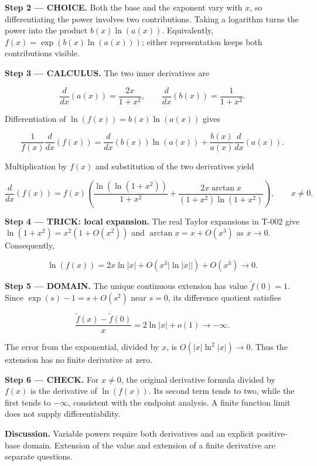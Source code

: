 \documentclass[11pt,oneside,openany]{book}
\begin{document}
\begin{ChoiceStep}
\textbf{Step 2 --- CHOICE.} Both the base and the exponent vary with \(x\), so differentiating the power involves two contributions. Taking a logarithm turns the power into the product \(b(x)\ln(a(x))\). Equivalently, \(f(x)=\exp(b(x)\ln(a(x)))\); either representation keeps both contributions visible.

\end{ChoiceStep}
\textbf{Step 3 --- CALCULUS.} The two inner derivatives are

\[
\frac{d}{dx}(a(x))=\frac{2x}{1+x^2},
\qquad
\frac{d}{dx}(b(x))=\frac{1}{1+x^2}.
\]

Differentiation of \(\ln(f(x))=b(x)\ln(a(x))\) gives

\[
\frac{1}{f(x)}\frac{d}{dx}(f(x))
=\frac{d}{dx}(b(x))\ln(a(x))
+\frac{b(x)}{a(x)}\frac{d}{dx}(a(x)).
\]

Multiplication by \(f(x)\) and substitution of the two derivatives yield

\[
\frac{d}{dx}\left(f(x)\right)
=f(x)\left(\frac{\ln(\ln(1+x^2))}{1+x^2}
+\frac{2x\arctan x}{(1+x^2)\ln(1+x^2)}\right),\qquad x\ne0.
\]

\begingroup\color{TrickPurple}
\textbf{Step 4 --- TRICK: local expansion.} The real Taylor expansions in T-002 give \(\ln(1+x^2)=x^2(1+O(x^2))\) and \(\arctan x=x+O(x^3)\) as \(x\to0\). Consequently,

\[
\ln(f(x))=2x\ln|x|+O(x^3|\ln|x||)+O(x^3)\longrightarrow0.
\]

\endgroup
\begin{DomainStep}
\textbf{Step 5 --- DOMAIN.} The unique continuous extension has value \(\widetilde f(0)=1\). Since \(\exp(s)-1=s+O(s^2)\) near \(s=0\), its difference quotient satisfies

\[
\frac{\widetilde f(x)-\widetilde f(0)}{x}
=2\ln|x|+o(1)\longrightarrow-\infty.
\]

The error from the exponential, divided by \(x\), is \(O(|x|\ln^2|x|)\to0\). Thus the extension has no finite derivative at zero.

\end{DomainStep}
\textbf{Step 6 --- CHECK.} For \(x\ne0\), the original derivative formula divided by \(f(x)\) is the derivative of \(\ln(f(x))\). Its second term tends to two, while the first tends to \(-\infty\), consistent with the endpoint analysis. A finite function limit does not supply differentiability.

\textbf{Discussion.} Variable powers require both derivatives and an explicit positive-base domain. Extension of the value and extension of a finite derivative are separate questions.
\clearpage
\end{document}
